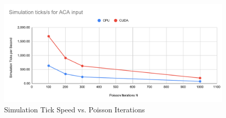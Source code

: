 \begin{figure}
    \centering
    \includegraphics[width=\linewidth]{Ch62Results/figures/temp_ticks_per_second_vs_iters_aca.pdf}
    \caption{Simulation Tick Speed vs. Poisson Iterations}
    \label{fig:results:ticks_per_second_bar_aca}
\end{figure}